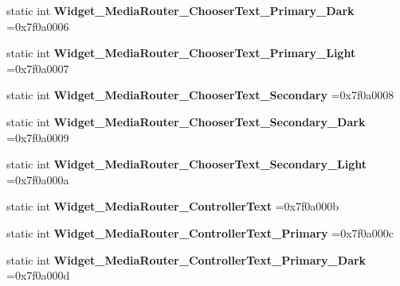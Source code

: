 \begin{DoxyCompactItemize}
static int {\bfseries Widget\+\_\+\+Media\+Router\+\_\+\+Chooser\+Text\+\_\+\+Primary\+\_\+\+Dark} =0x7f0a0006
\item 
\mbox{\label{classandroid_1_1support_1_1v7_1_1mediarouter_1_1R_1_1style_a986d970ba019e767f7ed83dfab5632e9}} 
static int {\bfseries Widget\+\_\+\+Media\+Router\+\_\+\+Chooser\+Text\+\_\+\+Primary\+\_\+\+Light} =0x7f0a0007
\item 
\mbox{\label{classandroid_1_1support_1_1v7_1_1mediarouter_1_1R_1_1style_a8ac83cd9a3e73f6058e43dd05ae5df2e}} 
static int {\bfseries Widget\+\_\+\+Media\+Router\+\_\+\+Chooser\+Text\+\_\+\+Secondary} =0x7f0a0008
\item 
\mbox{\label{classandroid_1_1support_1_1v7_1_1mediarouter_1_1R_1_1style_ad9b65c5a29d2e95a32030819fd39acbf}} 
static int {\bfseries Widget\+\_\+\+Media\+Router\+\_\+\+Chooser\+Text\+\_\+\+Secondary\+\_\+\+Dark} =0x7f0a0009
\item 
\mbox{\label{classandroid_1_1support_1_1v7_1_1mediarouter_1_1R_1_1style_af4c9acd082d0e8a32c27a74c8dc9f20c}} 
static int {\bfseries Widget\+\_\+\+Media\+Router\+\_\+\+Chooser\+Text\+\_\+\+Secondary\+\_\+\+Light} =0x7f0a000a
\item 
\mbox{\label{classandroid_1_1support_1_1v7_1_1mediarouter_1_1R_1_1style_a7c35086710eb9b81c18223482342d899}} 
static int {\bfseries Widget\+\_\+\+Media\+Router\+\_\+\+Controller\+Text} =0x7f0a000b
\item 
\mbox{\label{classandroid_1_1support_1_1v7_1_1mediarouter_1_1R_1_1style_a0f090eeca15ac395ff48b5cc691be3f8}} 
static int {\bfseries Widget\+\_\+\+Media\+Router\+\_\+\+Controller\+Text\+\_\+\+Primary} =0x7f0a000c
\item 
\mbox{\label{classandroid_1_1support_1_1v7_1_1mediarouter_1_1R_1_1style_a3c3acde5045fe09a4f43a702a50a47a6}} 
static int {\bfseries Widget\+\_\+\+Media\+Router\+\_\+\+Controller\+Text\+\_\+\+Primary\+\_\+\+Dark} =0x7f0a000d

\end{DoxyCompactItemize}

